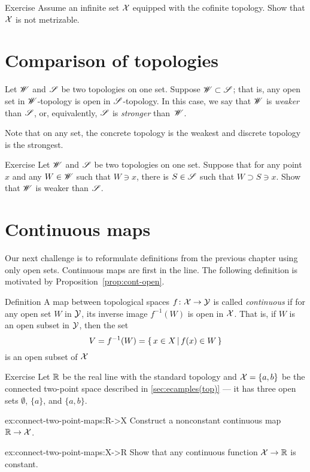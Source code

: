 \begin{thm}{Exercise}\label{ex:cofinite-metrizable}
Assume an infinite set $\mathcal{X}$ equipped with the cofinite topology.
Show that $\mathcal{X}$ is not metrizable.
\end{thm}

\section{Comparison of topologies}

Let $\mathscr{W}$ and $\mathscr{S}$ be two topologies on one set.
Suppose $\mathscr{W}\subset\mathscr{S}$; that is, any open set in $\mathscr{W}$-topology is open in $\mathscr{S}$-topology.
In this case, we say that $\mathscr{W}$ is \emph{weaker} than $\mathscr{S}$, or, equivalently, $\mathscr{S}$ is \emph{stronger} than~$\mathscr{W}$.

Note that on any set, the concrete topology is the weakest and discrete topology is the strongest.

\begin{thm}{Exercise}\label{ex:weaker-top}
Let $\mathscr{W}$ and $\mathscr{S}$ be two topologies on one set.
Suppose that for any point $x$ and any $W\in\mathscr{W}$ such that $W\ni x$, there is $S\in \mathscr{S}$ such that 
$W\supset S\ni x$.
Show that $\mathscr{W}$ is weaker than $\mathscr{S}$.
\end{thm}



\section{Continuous maps}

Our next challenge is to reformulate definitions from the previous chapter using only open sets.
Continuous maps are first in the line.
The following definition is motivated by Proposition~\ref{prop:cont-open}.

\begin{thm}{Definition}\label{def:cont-top}
A map between topological spaces 
$f\colon\mathcal{X}\to\mathcal{Y}$ is called \emph{continuous} if for any open set $W$ in $\mathcal{Y}$, its inverse image $f^{-1}(W)$ is open in $\mathcal{X}$.
That is, if $W$ is an open subset in $\mathcal{Y}$, then the set
\[V=f^{-1}(W)=\left\{\,{x\in X}\,\middle|\,{f(x)\in W}\,\right\}\]
is an open subset of $\mathcal{X}$
\end{thm}

\begin{thm}{Exercise}\label{ex:connect-two-point-maps}
Let $\mathbb{R}$ be the real line with the standard topology
and $\mathcal{X}=\{a,b\}$ be the connected two-point space described in \ref{sec:ecamples(top)} --- it has three open sets $\emptyset$, $\{a\}$, and $\{a,b\}$.

\begin{subthm}{ex:connect-two-point-maps:R->X}
Construct a nonconstant continuous map $\mathbb{R}\to \mathcal{X}$.
\end{subthm}

\begin{subthm}{ex:connect-two-point-maps:X->R}
Show that any continuous function $\mathcal{X}\to \mathbb{R}$ is constant.
\end{subthm}

\end{thm}

